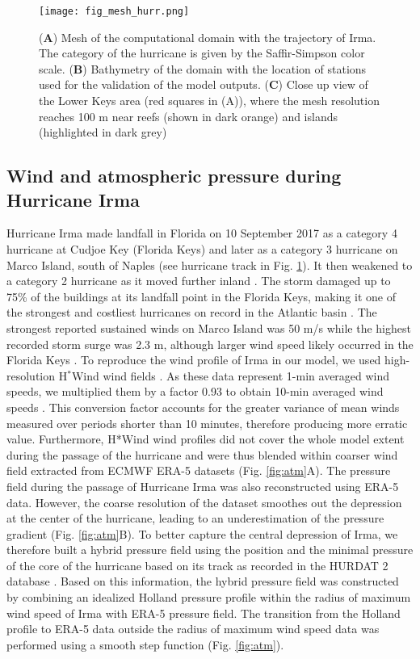 \documentclass[preprint,12pt,authoryear]{elsarticle}
\begin{document}
\begin{figure}
    \centering
    \texttt{[image: fig\_mesh\_hurr.png]}
    \caption{(\textbf{A}) Mesh of the computational domain with the trajectory of Irma. The category of the hurricane is given by the Saffir-Simpson color scale. (\textbf{B}) Bathymetry of the domain with the location of stations used for the validation of the model outputs. (\textbf{C}) Close up view of the Lower Keys area (red squares in (A)), where the mesh resolution reaches 100 m near reefs (shown in dark orange) and islands (highlighted in dark grey)}
    \label{fig:mesh}
\end{figure}

\subsection{Wind and atmospheric pressure during Hurricane Irma}

Hurricane Irma made landfall in Florida on 10 September 2017 as a category 4 hurricane at Cudjoe Key (Florida Keys) and later as a category 3 hurricane on Marco Island, south of Naples (see hurricane track in Fig. \ref{fig:mesh}). It then weakened to a category 2 hurricane as it moved further inland \citep{irmaNOAA}. The storm damaged up to 75\% of the buildings at its landfall point in the Florida Keys, making it one of the strongest and costliest hurricanes on record in the Atlantic basin \citep{xian2018brief,zhang2019modeling}. The strongest reported sustained winds on Marco Island was 50 m/s while the highest recorded storm surge was 2.3 m, although larger wind speed likely occurred in the Florida Keys \citep{pinelli2018overview}. To reproduce the wind profile of Irma in our model, we used high-resolution H$^\ast$Wind wind fields \citep{powell1998hrd}. As these data represent 1-min averaged wind speeds, we multiplied them by a factor 0.93 to obtain 10-min averaged wind speeds \citep{harper2010guidelines}. This conversion factor accounts for the greater variance of mean winds measured over periods shorter than 10 minutes, therefore producing more erratic value. Furthermore, H*Wind wind profiles did not cover the whole model extent during the passage of the hurricane and were thus blended within coarser wind field extracted from ECMWF ERA-5 datasets (Fig. \ref{fig:atm}A). The pressure field during the passage of Hurricane Irma was also reconstructed using ERA-5 data. However, the coarse resolution of the dataset smoothes out the depression at the center of the hurricane, leading to an underestimation of the pressure gradient (Fig. \ref{fig:atm}B). To better capture the central depression of Irma, we therefore built a hybrid pressure field using the position and the minimal pressure of the core of the hurricane based on its track as recorded in the HURDAT 2 database \citep{landsea2013atlantic}. Based on this information, the hybrid pressure field was constructed by combining an idealized Holland pressure profile \citep{lin2012hurricane} within the radius of maximum wind speed of Irma \citep{knaff2018statistical} with ERA-5 pressure field. The transition from the Holland profile to ERA-5 data outside the radius of maximum wind speed data was performed using a smooth step function (Fig. \ref{fig:atm}).
\end{document}
